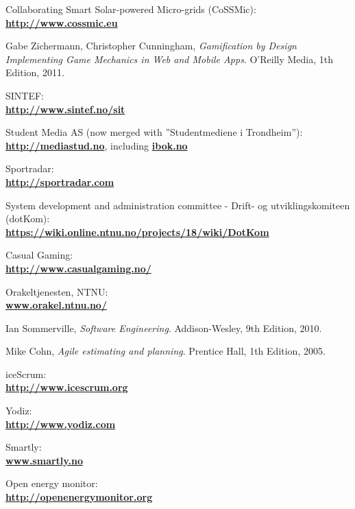 \begin{thebibliography}{1}

 Collaborating Smart Solar-powered Micro-grids (CoSSMic):\\ \textbf{\url{http://www.cossmic.eu}}

  Gabe Zichermann, Christopher Cunningham,
  \emph{
Gamification by Design\\
Implementing Game Mechanics in Web and Mobile Apps}.
  O'Reilly Media,
  1th Edition,
  2011.

 SINTEF: \\
\textbf{ \url{ http://www.sintef.no/sit}}

 Student Media AS (now merged with ''Studentmediene i Trondheim''):\\
\textbf{ \url{http://mediastud.no}}, including \textbf{ \url{ibok.no}}

 Sportradar:\\
\textbf{ \url{http://sportradar.com}}

 System development and administration committee - Drift- og utviklingskomiteen (dotKom):\\
\textbf{ \url{https://wiki.online.ntnu.no/projects/18/wiki/DotKom}}

 Casual Gaming:\\
\textbf{ \url{http://www.casualgaming.no/}}

 Orakeltjenesten, NTNU:\\
\textbf{ \url{www.orakel.ntnu.no/}}

  Ian Sommerville,
  \emph{Software Engineering}.
  Addison-Wesley,
  9th Edition,
  2010.

  Mike Cohn,
  \emph{Agile estimating and planning}.
  Prentice Hall,
  1th Edition,
  2005.

 iceScrum: \\
\textbf{ \url{http://www.icescrum.org}}

 Yodiz: \\
\textbf{ \url{ http://www.yodiz.com}}
        
 Smartly: \\
\textbf{ \url{www.smartly.no}}

 Open energy monitor:\\
\textbf{ \url{http://openenergymonitor.org}}


\end{thebibliography}

